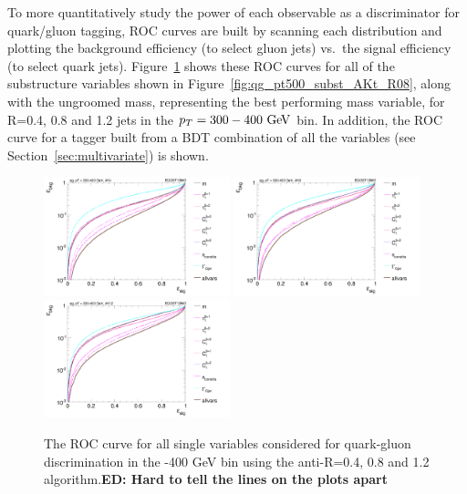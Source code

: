To more quantitatively study the power of each observable as a
discriminator for quark/gluon tagging, ROC curves are built by scanning each distribution
and plotting the background efficiency (to select gluon jets) vs.~the signal efficiency (to select quark jets). 
Figure~\ref{fig:qg_pt300_single} shows these ROC curves for all of the
substructure variables shown in 
Figure~\ref{fig:qg_pt500_subst_AKt_R08}, along with the ungroomed mass, representing the 
best performing mass variable, for R=0.4, 0.8 and 1.2 jets in the $\pt=300-400\GeV$
bin. In addition, the ROC curve for a tagger built from a BDT
combination of all the variables (see Section~\ref{sec:multivariate}) is shown.
%
\begin{figure}
\begin{center}
\includegraphics[width=0.48\textwidth]{./Figures/QGTagging/pT300/AKtR04/Rocs_1D_single.png}
\includegraphics[width=0.48\textwidth]{./Figures/QGTagging/pT300/AKtR08/Rocs_1D_single.png}
\includegraphics[width=0.48\textwidth]{./Figures/QGTagging/pT300/AKtR12/Rocs_1D_single.png}
\caption{The ROC curve for all single variables considered for
  quark-gluon discrimination in the -400 GeV bin using the
  anti-\kT R=0.4, 0.8 and 1.2 algorithm.{\bf ED: Hard to tell the lines on the
    plots apart}}
\label{fig:qg_pt300_single}
\end{center}
\end{figure}
